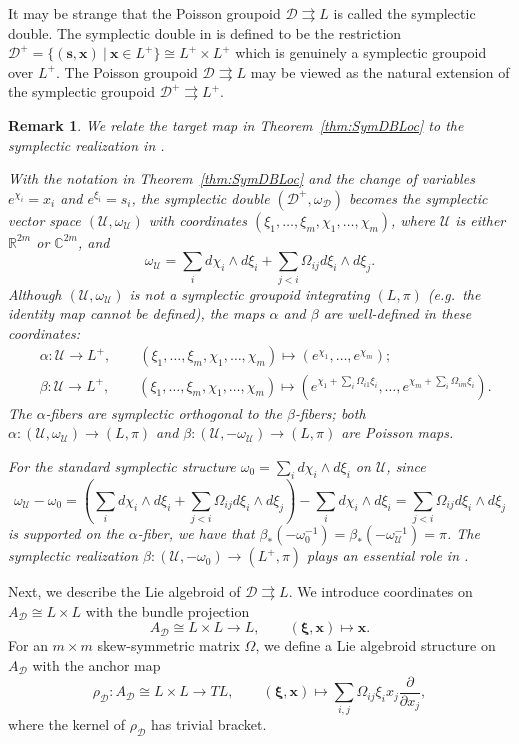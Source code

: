 \documentclass{amsart}
\newtheorem{remark}[theorem]{Remark}
\numberwithin{equation}{section}
\newcommand{\bfs}{{\boldsymbol{s}}}
\newcommand{\bfx}{{\boldsymbol{x}}}
\newcommand{\bfxi}{\boldsymbol{\xi}}
\newcommand{\cD}{\mathcal{D}}
\newcommand{\cU}{\mathcal{U}}
\newcommand{\CC}{\mathbb{C}}
\newcommand{\RR}{\mathbb{R}}
\newcommand{\rra}{\rightrightarrows}
\begin{document}
It may be strange that the Poisson groupoid $\cD \rra L$ is called the symplectic double. The symplectic double in \cite{FG09c} is defined to be the restriction $\cD^+ =\{(\bfs, \bfx) ~|~ \bfx \in L^+ \} \cong L^+ \times L^+$ which is genuinely a symplectic groupoid over $L^+$. The Poisson groupoid $\cD \rra L$ may be viewed as the natural extension of the symplectic groupoid $\cD^+ \rra L^+$.
\begin{remark}
  We relate the target map in Theorem~\ref{thm:SymDBLoc} to the symplectic realization in \cite{MR3691969}.
	
  With the notation in Theorem~\ref{thm:SymDBLoc} and the change of variables $e^{\chi_i} = x_i$ and $e^{\xi_i} = s_i$, the symplectic double $(\cD^+, \omega_\cD)$ becomes the symplectic vector space $(\cU, \omega_\cU)$ with coordinates $(\xi_1, \ldots, \xi_m, \chi_1, \ldots, \chi_m)$, where $\cU$ is either $\RR^{2m}$ or $\CC^{2m}$, and
  \[\omega_\cU = \sum_{i} d\chi_i \wedge d\xi_i + \sum_{j < i} \Omega_{ij} d\xi_i \wedge d\xi_j.\]
  Although $(\cU, \omega_\cU)$ is not a symplectic groupoid integrating $(L, \pi)$ (e.g.\ the identity map cannot be defined), the maps $\alpha$ and $\beta$ are well-defined in these coordinates:
  \begin{align*}
    & \alpha: \cU \to L^+, \qquad (\xi_1, \ldots, \xi_m, \chi_1, \ldots, \chi_m) \mapsto \left(e^{\chi_1}, \ldots, e^{\chi_m}\right); \\
    & \beta: \cU \to L^+, \qquad (\xi_1, \ldots, \xi_m, \chi_1, \ldots, \chi_m) \mapsto \left(e^{\chi_1+\sum_i\Omega_{i1}\xi_i}, \ldots, e^{\chi_m+\sum_i\Omega_{im}\xi_i}\right).
  \end{align*}
  The $\alpha$-fibers are symplectic orthogonal to the $\beta$-fibers; both $\alpha: (\cU, \omega_\cU) \to (L, \pi)$ and $\beta: (\cU, - \omega_\cU) \to (L, \pi)$ are Poisson maps.

  For the standard symplectic structure $\omega_0 = \sum_{i} d\chi_i \wedge d\xi_i$ on $\cU$, since
  \[\omega_\cU - \omega_0 = \left(\sum_{i} d\chi_i \wedge d\xi_i + \sum_{j < i} \Omega_{ij} d\xi_i \wedge d\xi_j \right) - \sum_{i} d\chi_i \wedge d\xi_i  =\sum_{j < i} \Omega_{ij} d\xi_i \wedge d\xi_j\]
  is supported on the $\alpha$-fiber, we have that $\beta_*(-\omega_0^{-1}) = \beta_*(-\omega_\cU^{-1}) = \pi$.
  The symplectic realization $\beta: (\cU, -\omega_0) \to (L^+, \pi)$ plays an essential role in \cite{MR3691969}.
\end{remark}

Next, we describe the Lie algebroid of $\cD \rra L$.
We introduce coordinates on $A_\cD \cong L\times L$ with the bundle projection
\[A_\cD \cong L\times L \to L, \qquad (\bfxi, \bfx) \mapsto \bfx.\]
For an $m\times m$ skew-symmetric matrix $\Omega$, we define a Lie algebroid structure on $A_\cD$ with the anchor map
\[\rho_\cD: A_\cD \cong L\times L \to TL, \qquad (\bfxi, \bfx) \mapsto \sum_{i,j} \Omega_{ij}\xi_i x_j\frac{\partial}{\partial x_j},\]
where the kernel of $\rho_\cD$ has trivial bracket.
\end{document}

